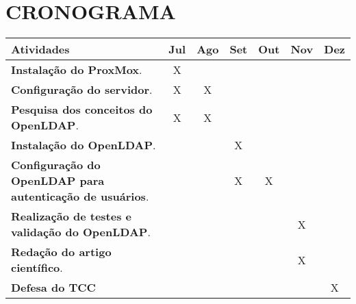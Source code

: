 \newpage

\section{CRONOGRAMA}
\label{sec:cronograma}


\begin{center}
	\begin{tabular}{ |p{8cm}|c|c|c|c|c|c| }
		\hline
		\textbf{Atividades} & \textbf{Jul} & \textbf{Ago} & \textbf{Set} & \textbf{Out} & \textbf{Nov} & \textbf{Dez} \\
		\hline
		\textbf{Instalação do ProxMox}. & X  &  &  &  &  &   \\
		\hline
		\textbf{Configuração do servidor}. & X & X  &  &  &  &   \\
		\hline
		\textbf{Pesquisa dos conceitos do OpenLDAP}. & X & X  &  &  &  &  \\
		\hline
		\textbf{Instalação do OpenLDAP}. &  & & X  &  &  & \\
		\hline
		\textbf{Configuração do OpenLDAP para autenticação de usuários}. &  &  & X & X  &  &\\
		\hline
        \textbf{Realização de testes e validação do OpenLDAP}. &  &  &  &  & X  &\\
		\hline
        \textbf{Redação do artigo científico}.  &  &  &  &  & X  &\\
        \hline
		\textbf{Defesa do TCC} &  &  &  &  &  & X \\
		\hline
	\end{tabular}
\end{center}
